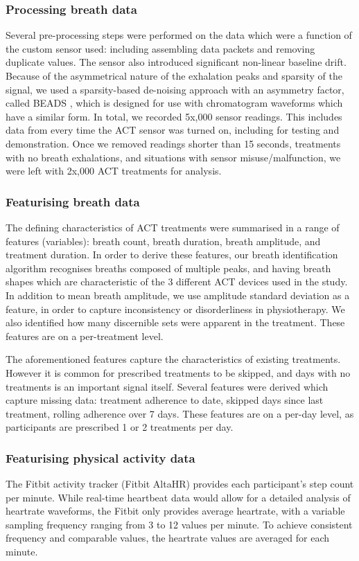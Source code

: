 \documentclass{article}
\begin{document}
\subsubsection{Processing breath data}
Several pre-processing steps were performed on the data which were a function of the custom sensor used: including assembling data packets and removing duplicate values. The sensor also introduced significant non-linear baseline drift. Because of the asymmetrical nature of the exhalation peaks and sparsity of the signal, we used a sparsity-based de-noising approach with an asymmetry factor, called BEADS \cite{Ning2014}, which is designed for use with chromatogram waveforms which have a similar form. 
In total, we recorded 5x,000 sensor readings. This includes data from every time the ACT sensor was turned on, including for testing and demonstration. Once we removed readings shorter than 15 seconds, treatments with no breath exhalations, and situations with sensor misuse/malfunction, we were left with 2x,000 ACT treatments for analysis. 

\subsubsection{Featurising breath data}
The defining characteristics of ACT treatments were summarised in a range of features (variables): breath count, breath duration, breath amplitude, and treatment duration. In order to derive these features, our breath identification algorithm recognises breaths composed of multiple peaks, and having breath shapes which are characteristic of the 3 different ACT devices used in the study. In addition to mean breath amplitude, we use amplitude standard deviation as a feature, in order to capture inconsistency or disorderliness in physiotherapy. We also identified how many discernible sets were apparent in the treatment. These features are on a per-treatment level. 

The aforementioned features capture the characteristics of existing treatments. However it is common for prescribed treatments to be skipped, and days with no treatments is an important signal itself. Several features were derived which capture missing data: treatment adherence to date, skipped days since last treatment, rolling adherence over 7 days. These features are on a per-day level, as participants are prescribed 1 or 2 treatments per day. 


\subsubsection{Featurising physical activity data}
The Fitbit activity tracker (Fitbit AltaHR) provides each participant’s step count per minute. While real-time heartbeat data would allow for a detailed analysis of heartrate waveforms, the Fitbit only provides average heartrate, with a variable sampling frequency ranging from 3 to 12 values per minute. To achieve consistent frequency and comparable values, the heartrate values are averaged for each minute.   
\end{document}
